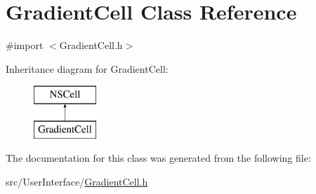\hypertarget{interface_gradient_cell}{\section{Gradient\-Cell Class Reference}
\label{interface_gradient_cell}
}


{\ttfamily \#import $<$Gradient\-Cell.\-h$>$}

Inheritance diagram for Gradient\-Cell\-:\begin{figure}[H]
\begin{center}
\leavevmode
\includegraphics[height=2.000000cm]{interface_gradient_cell}
\end{center}
\end{figure}


The documentation for this class was generated from the following file\-:\begin{DoxyCompactItemize}
\item 
src/\-User\-Interface/\hyperlink{_gradient_cell_8h}{Gradient\-Cell.\-h}\end{DoxyCompactItemize}
